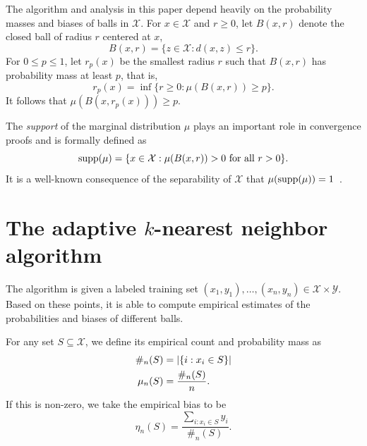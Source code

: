 \documentclass{article}
\def\X{{\mathcal X}}
\def\Y{{\mathcal Y}}
\def\supp{{\rm supp}}
\begin{document}
The algorithm and analysis in this paper depend heavily on the probability masses and biases of balls in $\X$. For $x \in \X$ and $r \geq 0$, let $B(x,r)$ denote the closed ball of radius $r$ centered at $x$, 
$$ B(x,r) = \{ z \in \X : d(x,z) \leq r \} .$$
For $0 \leq p \leq 1$, let $r_p(x)$ be the smallest radius $r$ such that $B(x,r)$ has probability mass at least $p$, that is,
\begin{equation}
r_p(x) = \inf \{r \geq 0: \mu(B(x,r)) \geq p \}.
\label{eq:probability-radius}
\end{equation}
It follows that $\mu(B(x,r_p(x))) \geq p$.

The {\it support} of the marginal distribution $\mu$ plays an important role in convergence proofs and is formally defined as
$$ \supp(\mu) = \{x \in \X: \mbox{$\mu(B(x,r)) > 0$ for all $r > 0$}\} .$$
It is a well-known consequence of the separability of $\X$ that $\mu(\supp(\mu)) = 1$~\cite{CH67}.



\section{The adaptive $k$-nearest neighbor algorithm}\label{sec:alg}

The algorithm is given a labeled training set
$(x_1, y_1), \ldots, (x_n, y_n) \in \X \times \Y$.
Based on these points, it is able to compute empirical estimates of the probabilities and biases of different balls.

For any set $S \subseteq \X$, we define its empirical count and probability mass as
\begin{align}
\notag \#_n(S) &= |\{i: x_i \in S\}| \\
\mu_n(S) &= \frac{\#_n(S)}{n} .
\label{eq:empirical-mass}
\end{align}
If this is non-zero, we take the empirical bias to be
\begin{equation}
\eta_n(S) = \frac{\sum_{i: x_i \in S} y_i}{\#_n(S)} .
\label{eq:empirical-bias}
\end{equation}
\end{document}
